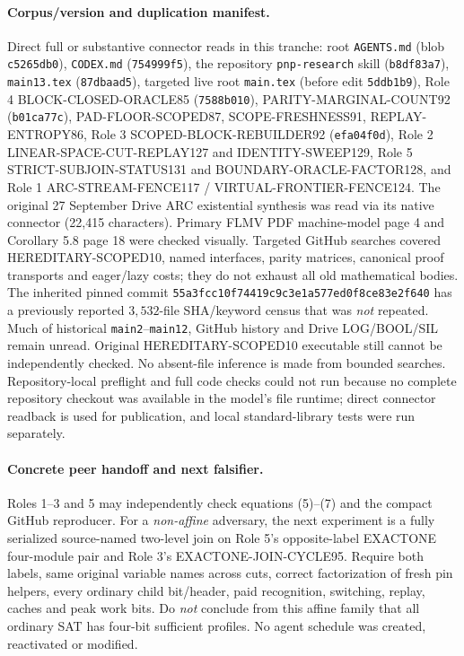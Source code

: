 \documentclass[11pt]{article}
\begin{document}
\paragraph{Corpus/version and duplication manifest.}
Direct full or substantive connector reads in this tranche:
root \texttt{AGENTS.md} (blob \texttt{c5265db0}),
\texttt{CODEX.md} (\texttt{754999f5}),
the repository \texttt{pnp-research} skill
(\texttt{b8df83a7}), \texttt{main13.tex}
(\texttt{87dbaad5}), targeted live root
\texttt{main.tex} (before edit \texttt{5ddb1b9}),
Role 4 BLOCK-CLOSED-ORACLE85
(\texttt{7588b010}), PARITY-MARGINAL-COUNT92
(\texttt{b01ca77c}), PAD-FLOOR-SCOPED87,
SCOPE-FRESHNESS91, REPLAY-ENTROPY86,
Role 3 SCOPED-BLOCK-REBUILDER92
(\texttt{efa04f0d}), Role 2 LINEAR-SPACE-CUT-REPLAY127
and IDENTITY-SWEEP129, Role 5 STRICT-SUBJOIN-STATUS131
and BOUNDARY-ORACLE-FACTOR128, and
Role 1 ARC-STREAM-FENCE117 / VIRTUAL-FRONTIER-FENCE124.
The original 27 September Drive ARC existential synthesis was
read via its native connector (22,415 characters).
Primary FLMV PDF machine-model page 4 and Corollary 5.8
page 18 were checked visually. Targeted GitHub searches
covered HEREDITARY-SCOPED10, named interfaces, parity
matrices, canonical proof transports and eager/lazy costs;
they do not exhaust all old mathematical bodies.
The inherited pinned commit
\texttt{55a3fcc10f74419c9c3e1a577ed0f8ce83e2f640}
has a previously reported $3{,}532$-file SHA/keyword census
that was \emph{not} repeated. Much of historical
\texttt{main2}--\texttt{main12}, GitHub history and Drive
LOG/BOOL/SIL remain unread. Original HEREDITARY-SCOPED10
executable still cannot be independently checked.
No absent-file inference is made from bounded searches.
Repository-local preflight and full code checks could not
run because no complete repository checkout was available
in the model's file runtime; direct connector readback is
used for publication, and local standard-library tests
were run separately.

\paragraph{Concrete peer handoff and next falsifier.}
Roles 1--3 and 5 may independently check equations
(5)--(7) and the compact GitHub reproducer.
For a \emph{non-affine} adversary, the next experiment is
a fully serialized source-named two-level join on Role 5's
opposite-label EXACTONE four-module pair and Role 3's
EXACTONE-JOIN-CYCLE95. Require both labels, same original
variable names across cuts, correct factorization of fresh
pin helpers, every ordinary child bit/header, paid
recognition, switching, replay, caches and peak work bits.
Do \emph{not} conclude from this affine family that all
ordinary SAT has four-bit sufficient profiles.
No agent schedule was created, reactivated or modified.
\end{document}
